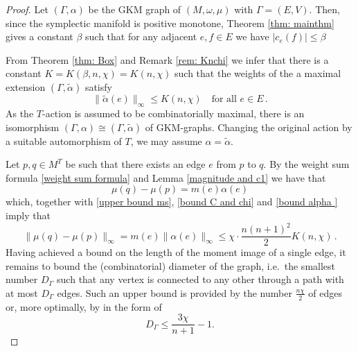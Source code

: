 \documentclass[12pt,a4paper]{amsart}
\newcommand{\mft}{\mathfrak{t}}
\newcommand{\RR}{\mathbb{R}}
\theoremstyle{plain}
\theoremstyle{definition}
\begin{document}
\begin{proof}
Let $(\Gamma,\alpha)$ be the GKM graph of $(M,\omega,\mu)$ with $\Gamma=(E,V)$. Then, since the symplectic manifold is positive monotone, 
Theorem \ref{thm: mainthm} gives a constant $\beta$ such that for any adjacent $e,f\in E$ we have $|c_e(f)|\leq \beta$
 
From Theorem \ref{thm: Box} and Remark \ref{rem: Knchi} we infer that there is a constant $K=K(\beta,n,\chi)=K(n,\chi)$ such that 
the weights of the a maximal extension $(\Gamma,\tilde{\alpha})$ satisfy
\begin{equation}\label{bound alpha }
\|\tilde\alpha(e)\|_\infty\leq K(n,\chi)\quad \text{for all  } e\in E\,.
\end{equation}
As the $T$-action is assumed to be combinatorially maximal, there is an isomorphism $(\Gamma,\alpha)\cong (\Gamma,\tilde{\alpha})$ of GKM-graphs. Changing the original action by a suitable automorphism of $T$, we may assume $\alpha=\tilde{\alpha}$.

Let $p,q\in M^T$ be such that there exists an edge $e$ from $p$ to $q$.
By the weight sum formula \eqref{weight sum formula} and Lemma \ref{magnitude and c1}
 we have that 
\begin{equation}\label{mu alpha m}
\mu(q)-\mu(p)=m(e)\alpha(e)
\end{equation}
which, together with \eqref{upper bound ms}, \eqref{bound C and chi} and \eqref{bound alpha } imply that
\begin{equation}\label{bound mu pq}
\|\mu(q)-\mu(p)\|_\infty=m(e)\|\alpha(e)\|_\infty\leq \chi\cdot\frac{n(n+1)^2}{2} K(n,\chi)\,.
\end{equation}
Having achieved a bound on the length of the moment image of a single edge, it remains to
bound the (combinatorial) diameter of the graph, i.e.\ the smallest number $D_\Gamma$ such
that any vertex is connected to any other through a path with at most $D_\Gamma$ edges.
Such an upper bound is provided by the number $\frac{n\chi}{2}$ of edges or, more
optimally, by \cite[Theorem 1]{MR1007715} in the form of
\[D_\Gamma\leq \frac{3\chi}{n+1}-1.\]


\end{proof}
\end{document}
